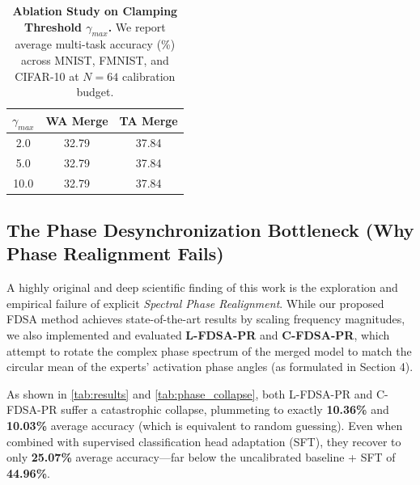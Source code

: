 \documentclass{article}
\begin{document}
\begin{table}[h]
\caption{\textbf{Ablation Study on Clamping Threshold $\gamma_{max}$.} We report average multi-task accuracy (\%) across MNIST, FMNIST, and CIFAR-10 at $N=64$ calibration budget.}
\label{tab:ablation}
\vskip 0.15in
\begin{center}
\begin{small}
\begin{sc}
\begin{tabular}{ccc}
\toprule
$\gamma_{max}$ & WA Merge & TA Merge \\
\midrule
2.0 & 32.79 & 37.84 \\
5.0 & 32.79 & 37.84 \\
10.0 & 32.79 & 37.84 \\
\bottomrule
\end{tabular}
\end{sc}
\end{small}
\end{center}
\vskip -0.1in
\end{table}

\subsection{The Phase Desynchronization Bottleneck (Why Phase Realignment Fails)}
A highly original and deep scientific finding of this work is the exploration and empirical failure of explicit \textit{Spectral Phase Realignment}. While our proposed FDSA method achieves state-of-the-art results by scaling frequency magnitudes, we also implemented and evaluated \textbf{L-FDSA-PR} and \textbf{C-FDSA-PR}, which attempt to rotate the complex phase spectrum of the merged model to match the circular mean of the experts' activation phase angles (as formulated in Section 4).

As shown in \cref{tab:results} and \cref{tab:phase_collapse}, both L-FDSA-PR and C-FDSA-PR suffer a catastrophic collapse, plummeting to exactly \textbf{10.36\%} and \textbf{10.03\%} average accuracy (which is equivalent to random guessing). Even when combined with supervised classification head adaptation (SFT), they recover to only \textbf{25.07\%} average accuracy—far below the uncalibrated baseline + SFT of \textbf{44.96\%}.
\end{document}
